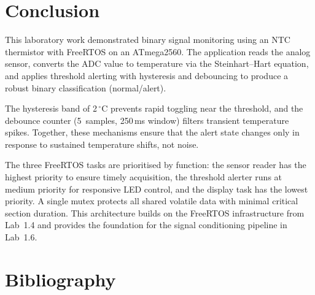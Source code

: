 \documentclass[12pt]{article}
\begin{document}
\section{Conclusion}

\hspace{0.8cm}
This laboratory work demonstrated binary signal monitoring using an NTC thermistor with FreeRTOS on an ATmega2560. The application reads the analog sensor, converts the ADC value to temperature via the Steinhart--Hart equation, and applies threshold alerting with hysteresis and debouncing to produce a robust binary classification (normal/alert).

\hspace{0.8cm}
The hysteresis band of 2\,\(^{\circ}\)C prevents rapid toggling near the threshold, and the debounce counter (5~samples, 250\,ms window) filters transient temperature spikes. Together, these mechanisms ensure that the alert state changes only in response to sustained temperature shifts, not noise.

\hspace{0.8cm}
The three FreeRTOS tasks are prioritised by function: the sensor reader has the highest priority to ensure timely acquisition, the threshold alerter runs at medium priority for responsive LED control, and the display task has the lowest priority. A single mutex protects all shared volatile data with minimal critical section duration. This architecture builds on the FreeRTOS infrastructure from Lab~1.4 and provides the foundation for the signal conditioning pipeline in Lab~1.6.

\section{Bibliography}

\begingroup
\makeatletter
\renewcommand{\section}[2]{}
\makeatother
\end{document}
